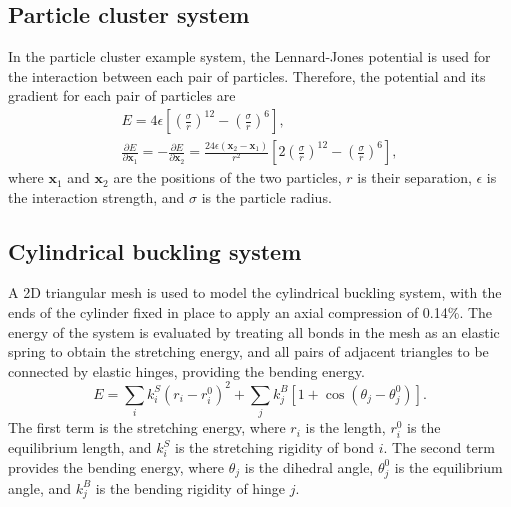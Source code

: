 \documentclass[twocolumn,10pt]{revtex4-2}
\begin{document}
\subsection{Particle cluster system}
In the particle cluster example system, the Lennard-Jones potential is used for the interaction between each pair of particles.
Therefore, the potential and its gradient for each pair of particles are
\begin{gather}
  E = 4\epsilon \left[ \left(\frac{\sigma}{r}\right)^{12} - \left(\frac{\sigma}{r}\right)^6 \right], \\
  \frac{\partial E}{\partial \bm{x}_1} = -\frac{\partial E}{\partial \bm{x}_2} =
    \frac{24 \epsilon (\bm{x}_2 - \bm{x}_1)}{r^2} \left[ 2 \left(\frac{\sigma}{r}\right)^{12} - \left(\frac{\sigma}{r}\right)^6 \right],
\end{gather}
where $\bm{x}_1$ and $\bm{x}_2$ are the positions of the two particles, $r$ is their separation, $\epsilon$ is the interaction strength, and $\sigma$ is the particle radius.

\subsection{Cylindrical buckling system}
A 2D triangular mesh is used to model the cylindrical buckling system, with the ends of the cylinder fixed in place to apply an axial compression of 0.14\%.
The energy of the system is evaluated by treating all bonds in the mesh as an elastic spring to obtain the stretching energy, and all pairs of adjacent triangles to be connected by elastic hinges, providing the bending energy.
\begin{equation}
  E = \sum_i k^S_i (r_i - r^0_i)^2 + \sum_j k^B_j [1 + \cos(\theta_j - \theta^0_j)].
\end{equation}
The first term is the stretching energy, where $r_i$ is the length, $r^0_i$ is the equilibrium length, and $k^S_i$ is the stretching rigidity of bond $i$.
The second term provides the bending energy, where $\theta_j$ is the dihedral angle, $\theta^0_j$ is the equilibrium angle, and $k^B_j$ is the bending rigidity of hinge $j$.
\end{document}
